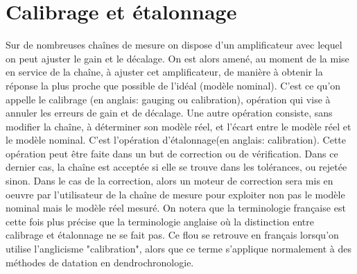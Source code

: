 \section{Calibrage et étalonnage}

Sur de nombreuses chaînes de mesure on dispose d'un amplificateur avec lequel on peut ajuster le gain et le décalage. On est alors amené, au moment de la mise en service de la chaîne, à ajuster cet amplificateur, de manière à obtenir la réponse la plus proche que possible de l'idéal (modèle nominal). C'est ce qu'on appelle le calibrage (en anglais: gauging ou calibration), opération qui vise à annuler les erreurs de gain et de décalage. Une autre opération consiste, sans modifier la chaîne, à déterminer son modèle réel, et l'écart entre le modèle réel et le modèle nominal. C'est l'opération d'étalonnage(en anglais: calibration). Cette opération peut être faite dans un but de correction ou de vérification. Dans ce dernier cas, la chaîne est acceptée si elle se trouve dans les tolérances, ou rejetée sinon. Dans le cas de la correction, alors un moteur de correction sera mis en oeuvre par l'utilisateur de la chaîne de mesure pour exploiter non pas le modèle nominal mais le modèle réel mesuré.
On notera que la terminologie française est cette fois plus précise que la terminologie anglaise où la distinction entre calibrage et étalonnage ne se fait pas. Ce flou se retrouve en français lorsqu'on utilise l'anglicisme "calibration", alors que ce terme s'applique normalement à des méthodes de datation en dendrochronologie.
\begin{center}
\end{center}

